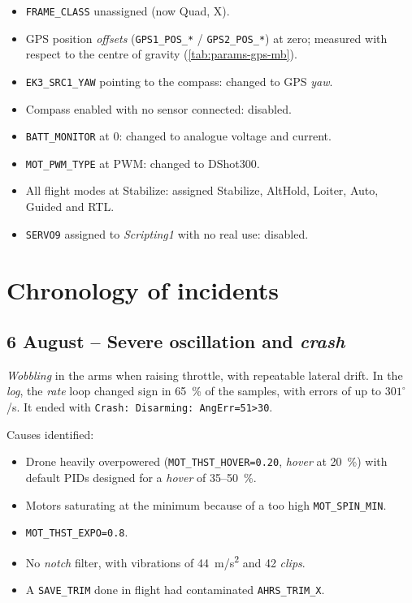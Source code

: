 \begin{itemize}
    \item \texttt{FRAME\_CLASS} unassigned (now Quad, X).
    \item GPS position \emph{offsets} (\texttt{GPS1\_POS\_*} / \texttt{GPS2\_POS\_*}) at zero; measured with respect to the centre of gravity (\cref{tab:params-gps-mb}).
    \item \texttt{EK3\_SRC1\_YAW} pointing to the compass: changed to GPS \emph{yaw}.
    \item Compass enabled with no sensor connected: disabled.
    \item \texttt{BATT\_MONITOR} at 0: changed to analogue voltage and current.
    \item \texttt{MOT\_PWM\_TYPE} at PWM: changed to DShot300.
    \item All flight modes at Stabilize: assigned Stabilize, AltHold, Loiter, Auto, Guided and RTL.
    \item \texttt{SERVO9} assigned to \emph{Scripting1} with no real use: disabled.
\end{itemize}

\section{Chronology of incidents}
\label{sec:cronologia-incidents}

\subsection{6 August -- Severe oscillation and \emph{crash}}

\emph{Wobbling} in the arms when raising throttle, with repeatable lateral drift. In the \emph{log}, the \emph{rate} loop changed sign in 65~\% of the samples, with errors of up to $301^{\circ}$/s. It ended with \texttt{Crash: Disarming: AngErr=51>30}.

Causes identified:
\begin{itemize}
    \item Drone heavily overpowered (\texttt{MOT\_THST\_HOVER=0.20}, \emph{hover} at 20~\%) with default PIDs designed for a \emph{hover} of 35--50~\%.
    \item Motors saturating at the minimum because of a too high \texttt{MOT\_SPIN\_MIN}.
    \item \texttt{MOT\_THST\_EXPO=0.8}.
    \item No \emph{notch} filter, with vibrations of 44~m/s\textsuperscript{2} and 42 \emph{clips}.
    \item A \texttt{SAVE\_TRIM} done in flight had contaminated \texttt{AHRS\_TRIM\_X}.
\end{itemize}

